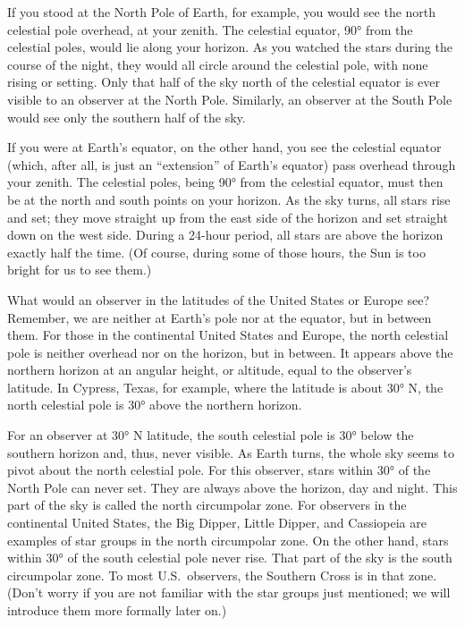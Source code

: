 \documentclass[main.tex]{subfiles}
\begin{document}
If you stood at the North Pole of Earth, for example, you would see the north celestial pole overhead, at your zenith. The celestial equator, \ang{90} from the celestial poles, would lie along your horizon. As you watched the stars during the course of the night, they would all circle around the celestial pole, with none rising or setting. Only that half of the sky north of the celestial equator is ever visible to an observer at the North Pole. Similarly, an observer at the South Pole would see only the southern half of the sky.

\vspace{1em}

If you were at Earth's equator, on the other hand, you see the celestial equator (which, after all, is just an ``extension'' of Earth's equator) pass overhead through your zenith. The celestial poles, being \ang{90} from the celestial equator, must then be at the north and south points on your horizon. As the sky turns, all stars rise and set; they move straight up from the east side of the horizon and set straight down on the west side. During a 24-hour period, all stars are above the horizon exactly half the time. (Of course, during some of those hours, the Sun is too bright for us to see them.)

\vspace{1em}

What would an observer in the latitudes of the United States or Europe see? Remember, we are neither at Earth's pole nor at the equator, but in between them. For those in the continental United States and Europe, the north celestial pole is neither overhead nor on the horizon, but in between. It appears above the northern horizon at an angular height, or altitude, equal to the observer's latitude. In Cypress, Texas, for example, where the latitude is about \ang{30} N, the north celestial pole is \ang{30} above the northern horizon.

\vspace{1em}

For an observer at \ang{30} N latitude, the south celestial pole is \ang{30} below the southern horizon and, thus, never visible. As Earth turns, the whole sky seems to pivot about the north celestial pole. For this observer, stars within \ang{30} of the North Pole can never set. They are always above the horizon, day and night. This part of the sky is called the north \gls{circumpolar zone}. For observers in the continental United States, the Big Dipper, Little Dipper, and Cassiopeia are examples of star groups in the north circumpolar zone. On the other hand, stars within \ang{30} of the south celestial pole never rise. That part of the sky is the south circumpolar zone. To most U.S.~observers, the Southern Cross is in that zone. (Don't worry if you are not familiar with the star groups just mentioned; we will introduce them more formally later on.)
\end{document}
